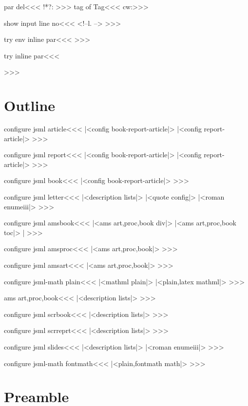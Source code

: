 \<par del\><<<
!*?: >>>
\<tag of Tag\><<<
 cw:>>>


\<show input line no\><<<
<!--l. \the{}-->%
>>>




\<try env inline par\><<<
\ShowPar 
>>>

\<try inline par\><<<
\ShowPar \par{\HCondtrue\noindent}%
>>>




\section{Outline}


\<configure jsml article\><<<
|<config book-report-article|>
|<config report-article|>
>>>

\<configure jsml report\><<<
|<config book-report-article|>
|<config report-article|>
>>>

\<configure jsml book\><<<
|<config book-report-article|>
>>>


\<configure jsml letter\><<< 
|<description lists|>
|<quote config|>
|<roman enumeiii|>
>>>


\<configure jsml amsbook\><<<
|<ams art,proc,book div|>
|<ams art,proc,book toc|>  |%
>>>

\<configure jsml amsproc\><<<
|<ams art,proc,book|>
>>>



\<configure jsml amsart\><<<
|<ams art,proc,book|>
>>>

\<configure jsml-math plain\><<<
|<mathml plain|>
|<plain,latex mathml|>
>>>


\<ams art,proc,book\><<<
|<description lists|>
>>>


\<configure jsml scrbook\><<<
|<description lists|>
>>>


\<configure jsml scrreprt\><<<
|<description lists|>
>>>


\<configure jsml slides\><<<
|<description lists|>
|<roman enumeiii|>
>>>




\<configure jsml-math fontmath\><<<
|<plain,fontmath math|>
>>>






\section{Preamble}

